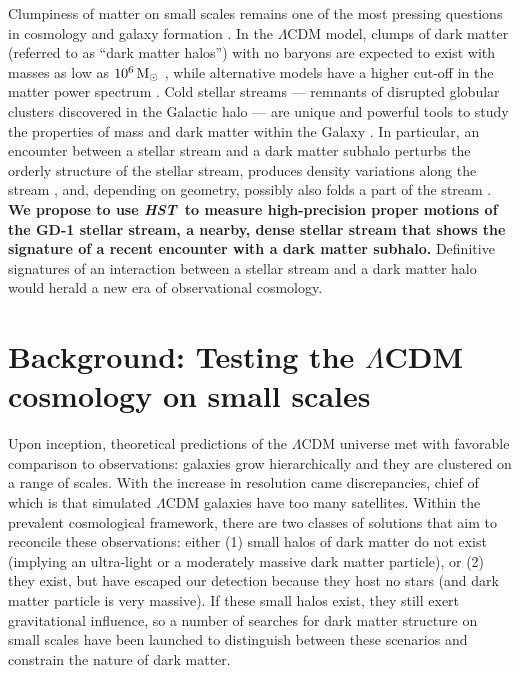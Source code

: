 \documentclass[12pt]{article}
\newcommand{\hst}{\textsl{HST}}
\begin{document}
%
%
\justification          %
\vspace{-0.5cm}

Clumpiness of matter on small scales remains one of the most pressing questions in cosmology and galaxy formation \parencite{bullock2017}.
In the $\Lambda$CDM model, clumps of dark matter (referred to as ``dark matter halos'') with no baryons are expected to exist with masses as low as $10^{6}\rm\,M_\odot$ \parencite{springel2008}, while alternative models have a higher cut-off in the matter power spectrum \parencite[e.g.,][]{bode2001,hu2000}.
Cold stellar streams --- remnants of disrupted globular clusters discovered in the Galactic halo \parencite{gc2016} --- are unique and powerful tools to study the properties of mass and dark matter within the Galaxy \parencite[e.g.,][]{bonaca2018}.
In particular, an encounter between a stellar stream and a dark matter subhalo perturbs the orderly structure of the stellar stream, produces density variations along the stream \parencite[e.g.,][]{carlberg2012}, and, depending on geometry, possibly also folds a part of the stream \parencite[e.g.,][]{yoon2011}.
{\bf We propose to use \hst\ to measure high-precision proper motions of the GD-1 stellar stream, a nearby, dense stellar stream that shows the signature of a recent encounter with a dark matter subhalo.}
Definitive signatures of an interaction between a stellar stream and a dark matter halo would herald a new era of observational cosmology.

\section*{Background: Testing the $\Lambda$CDM cosmology on small scales}
Upon inception, theoretical predictions of the $\Lambda$CDM universe met with favorable comparison to observations: galaxies grow hierarchically and they are clustered on a range of scales.
With the increase in resolution came discrepancies, chief of which is that simulated $\Lambda$CDM galaxies have too many satellites.
Within the prevalent cosmological framework, there are two classes of solutions that aim to reconcile these observations: either (1) small halos of dark matter do not exist (implying an ultra-light or a moderately massive dark matter particle), or (2) they exist, but have escaped our detection because they host no stars (and dark matter particle is very massive).
If these small halos exist, they still exert gravitational influence, so a number of searches for dark matter structure on small scales have been launched to distinguish between these scenarios and constrain the nature of dark matter.
\end{document}
